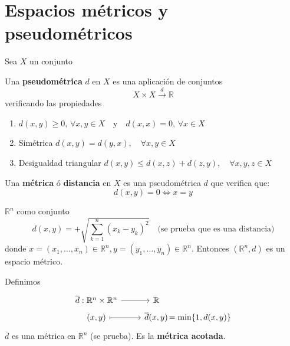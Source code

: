 \chapter{Espacios métricos y pseudométricos}
Sea $X$ un conjunto
\begin{defi} Una \textbf{pseudométrica} $d$ en $X$ es una aplicación de conjuntos
\[
    X \times X \overset{d}{\longrightarrow} \mathbb{R}
\]
verificando las propiedades
\begin{enumerate}
    \item $d(x, y) \ge 0, \, \forall x, y \in X \quad \text{y} \quad d(x, x) = 0, \, \forall x \in X$
    \item Simétrica $d(x, y) = d(y, x), \quad \forall x, y \in X$
    \item Desigualdad triangular $d(x, y) \le d(x, z) + d(z, y), \quad \forall x, y, z \in X$
\end{enumerate}
\end{defi}
\begin{defi} Una \textbf{métrica} ó \textbf{distancia} en $X$ es una pseudométrica $d$ que verifica que:
\[
    d(x, y) = 0 \iff x = y
\] \end{defi}
\begin{ejem} $\mathbb{R}^n$ como conjunto
\[
    d(x, y) = +\sqrt{\sum_{k=1}^n (x_k - y_k)^2} \quad \text{(se prueba que es una distancia)}
\]
donde $x = (x_1, \ldots, x_n) \in \mathbb{R}^n, y = (y_1, \ldots, y_n) \in \mathbb{R}^n$. Entonces $(\mathbb{R}^n, d)$ es un espacio métrico.

Definimos 
$$ \bt \overline{d} : \mathbb{R}^n \times \mathbb{R}^n \rar &  \mathbb{R} \\[-5mm] (x, y) \rarmaps & \overline{d}(x, y) &[-11mm] = \min\{1, d(x, y)\} \et $$
$\overline{d}$ es una métrica en $\mathbb{R}^n$ (se prueba). Es la \textbf{métrica acotada}.
\end{ejem}